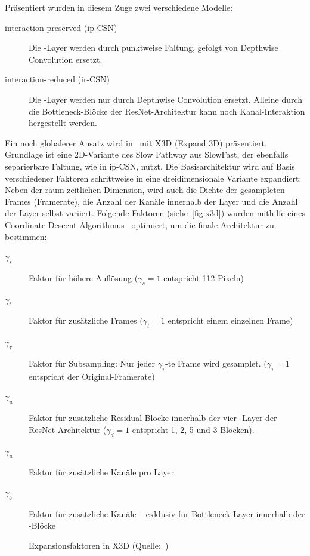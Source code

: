 Präsentiert wurden in diesem Zuge zwei verschiedene Modelle:
\begin{description}
    \item[interaction-preserved (ip-CSN)] Die \conv-Layer werden durch punktweise Faltung, gefolgt von Depthwise Convolution ersetzt.
    \item[interaction-reduced (ir-CSN)]  Die \conv-Layer werden nur durch Depthwise Convolution ersetzt.
    Alleine durch die Bottleneck-Blöcke der ResNet-Architektur kann noch Kanal-Interaktion hergestellt werden.
\end{description}

Ein noch globalerer Ansatz wird in~\cite{Feichtenhofer20} mit X3D (Expand 3D) präsentiert.
Grundlage ist eine 2D-Variante des Slow Pathway aus SlowFast, der ebenfalls separierbare Faltung, wie in ip-CSN, nutzt.
Die Basisarchitektur wird auf Basis verschiedener Faktoren schrittweise in eine dreidimensionale Variante expandiert:
Neben der raum-zeitlichen Dimension, wird auch die Dichte der gesampleten Frames (Framerate), die Anzahl der Kanäle innerhalb der Layer und die Anzahl der Layer selbst variiert.
Folgende Faktoren (siehe~\autoref{fig:x3d}) wurden mithilfe eines Coordinate Descent Algorithmus~\cite{Wright15} optimiert, um die finale Architektur zu bestimmen:

\begin{description}
    \item[$\gamma_s$] Faktor für höhere Auflösung ($\gamma_s = 1$ entspricht 112 Pixeln)
    \item[$\gamma_t$] Faktor für zusätzliche Frames ($\gamma_t = 1$ entspricht einem einzelnen Frame)
    \item[$\gamma_\tau$] Faktor für Subsampling: Nur jeder $\gamma_\tau$-te Frame wird gesamplet. ($\gamma_\tau = 1$ entspricht der Original-Framerate)
    \item[$\gamma_w$] Faktor für zusätzliche Residual-Blöcke innerhalb der vier \res-Layer der ResNet-Architektur ($\gamma_d = 1$ entspricht 1, 2, 5 und 3 Blöcken).
    \item[$\gamma_w$] Faktor für zusätzliche Kanäle pro Layer
    \item[$\gamma_b$] Faktor für zusätzliche Kanäle -- exklusiv für Bottleneck-Layer innerhalb der \res-Blöcke
\end{description}

\begin{figure}[h!]
    \centering
    \caption[Expansionsfaktoren in X3D]{Expansionsfaktoren in X3D (Quelle:~\cite{Feichtenhofer20})}
    \label{fig:x3d}
\end{figure}

